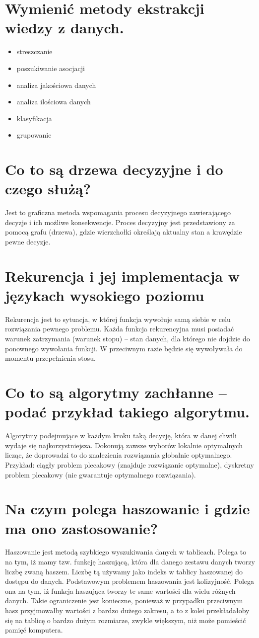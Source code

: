 \documentclass[12pt,a4paper]{article}
\begin{document}
	\section{Wymienić metody ekstrakcji wiedzy z danych.}
	\begin{itemize}
		\item streszczanie
		\item poszukiwanie asocjacji
		\item analiza jakościowa danych
		\item analiza ilościowa danych
		\item klasyfikacja
		\item grupowanie
	\end{itemize}

	\section{Co to są drzewa decyzyjne i do czego służą?}
	Jest to graficzna metoda wspomagania procesu decyzyjnego zawierającego decyzje i ich możliwe konsekwencje. Proces decyzyjny jest przedstawiony za pomocą grafu (drzewa), gdzie wierzchołki określają aktualny stan a krawędzie pewne decyzje.

	\section{Rekurencja i jej implementacja w językach wysokiego poziomu}
	Rekurencja jest to sytuacja, w której funkcja wywołuje samą siebie w celu rozwiązania pewnego problemu. Każda funkcja rekurencyjna musi posiadać warunek zatrzymania (warunek stopu) – stan danych, dla którego nie dojdzie do ponownego wywołania funkcji. W przeciwnym razie będzie się wywoływała do momentu przepełnienia stosu.

	\section{Co to są algorytmy zachłanne – podać przykład takiego algorytmu.}
	Algorytmy podejmujące w każdym kroku taką decyzję, która w danej chwili wydaje się najkorzystniejsza. Dokonują zawsze wyborów lokalnie optymalnych licząc, że doprowadzi to do znalezienia rozwiązania globalnie optymalnego. Przykład: ciągły problem plecakowy (znajduje rozwiązanie optymalne), dyskretny problem plecakowy (nie gwarantuje optymalnego rozwiązania).

	\section{Na czym polega haszowanie i gdzie ma ono zastosowanie?}
	Haszowanie jest metodą szybkiego wyszukiwania danych w tablicach. Polega to na tym, iż mamy tzw. funkcję haszującą, która dla danego zestawu danych tworzy liczbę zwaną haszem. Liczbę tą używamy jako indeks w tablicy haszowanej do dostępu do danych. Podstawowym problemem haszowania jest kolizyjność. Polega ona na tym, iż funkcja haszująca tworzy te same wartości dla wielu różnych danych. Takie ograniczenie jest konieczne, ponieważ w przypadku przeciwnym hasz przyjmowałby wartości z bardzo dużego zakresu, a to z kolei przekładałoby się na tablicę o bardzo dużym rozmiarze, zwykle większym, niż może pomieścić pamięć komputera.
\end{document}
